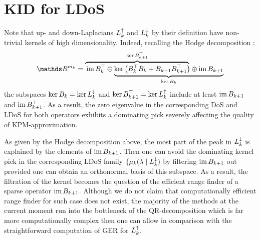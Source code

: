 \chapter{ KID for LDoS }
%
%

Note that up- and down-Laplacians \( L_{k}^{\uparrow} \) and \( L_{k}^{\downarrow} \) by their definition have non-trivial kernels of high dimensionality. Indeed, recalling the Hodge decomposition :
\begin{equation}
      \ds R^{m_k} = \lefteqn{\overbrace{\phantom{\im B_k^\top \oplus  \ker \left( B_k^\top B_k + B_{k+1} B_{k+1}^\top \right)}}^{\ker B_{k+1}^\top}} \im B_k^\top \oplus
      \underbrace{\ker \left( B_k^\top B_k + B_{k+1} B_{k+1}^\top \right) \oplus  \im B_{k+1}}_{\ker B_k}            
\end{equation}
the subspaces \( \ker B_k = \ker L_{k}^{\downarrow} \) and \( \ker B_{k+1}^\top = \ker L_{k}^{\uparrow} \) include at least \( \operatorname{im} B_{k+1}\) and \( \operatorname{im} B_{k+1}^\top \). As a result, the zero eigenvalue in the corresponding DoS and LDoS for both operators exhibits a dominating pick severely affecting the quality of KPM-approximation.

\begin{remark}
      As given by the Hodge decomposition above, the most part of the peak in \( L_{k}^{\downarrow} \) is explained by the elements of \( \operatorname{im} B_{k+1}\). Then one can avoid the dominating kernel pick in the corresponding LDoS family \( \{ \mu_k( \lambda \mid L_{k}^{\downarrow} ) \) by filtering \( \operatorname{im} B_{k+1}\) out provided one can obtain an orthonormal basis of this subspace. As a result, the filtration of the kernel becomes the question of the efficient range finder of a sparse operator \( \operatorname{im} B_{k+1} \). Although we do not claim that computationally efficient range finder for such case does not exist, the majority of the methods at the current moment run into the bottleneck of the QR-decomposition which is far more computationally complex then one can allow in comparison with the straightforward computation of GER for \( L_{k}^{\uparrow} \).
\end{remark}